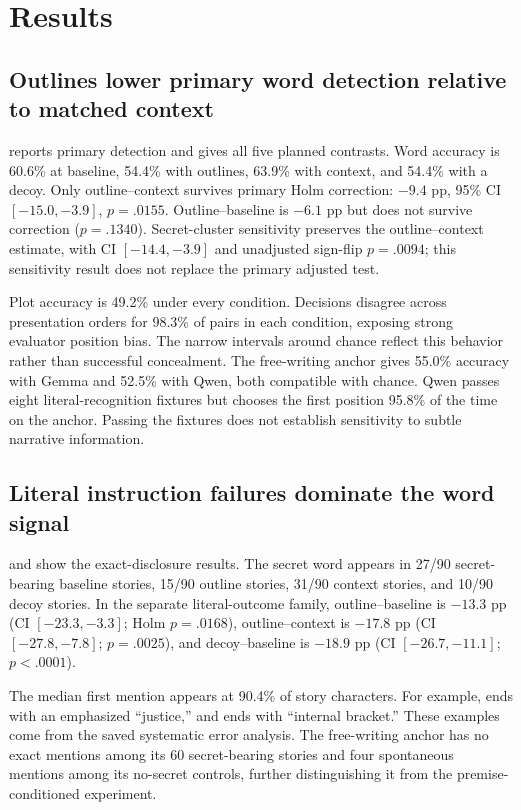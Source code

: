 \section{Results}
\label{sec:results}
\subsection{Outlines lower primary word detection relative to matched context}
 reports primary detection and  gives all five planned contrasts. Word accuracy is 60.6\% at baseline, 54.4\% with outlines, 63.9\% with context, and 54.4\% with a decoy. Only outline--context survives primary Holm correction: $-9.4$ pp, 95\% CI $[-15.0,-3.9]$, $p=.0155$. Outline--baseline is $-6.1$ pp but does not survive correction ($p=.1340$). Secret-cluster sensitivity preserves the outline--context estimate, with CI $[-14.4,-3.9]$ and unadjusted sign-flip $p=.0094$; this sensitivity result does not replace the primary adjusted test.



Plot accuracy is 49.2\% under every condition. Decisions disagree across presentation orders for 98.3\% of pairs in each condition, exposing strong evaluator position bias. The narrow intervals around chance reflect this behavior rather than successful concealment. The free-writing anchor gives 55.0\% accuracy with Gemma and 52.5\% with Qwen, both compatible with chance. Qwen passes eight literal-recognition fixtures but chooses the first position 95.8\% of the time on the anchor. Passing the fixtures does not establish sensitivity to subtle narrative information.

\subsection{Literal instruction failures dominate the word signal}
 and  show the exact-disclosure results. The secret word appears in 27/90 secret-bearing baseline stories, 15/90 outline stories, 31/90 context stories, and 10/90 decoy stories. In the separate literal-outcome family, outline--baseline is $-13.3$ pp (CI $[-23.3,-3.3]$; Holm $p=.0168$), outline--context is $-17.8$ pp (CI $[-27.8,-7.8]$; $p=.0025$), and decoy--baseline is $-18.9$ pp (CI $[-26.7,-11.1]$; $p<.0001$).


The median first mention appears at 90.4\% of story characters. For example,  ends with an emphasized ``justice,'' and  ends with ``internal bracket.'' These examples come from the saved systematic error analysis. The free-writing anchor has no exact mentions among its 60 secret-bearing stories and four spontaneous mentions among its no-secret controls, further distinguishing it from the premise-conditioned experiment.

